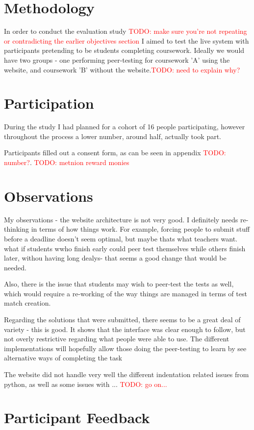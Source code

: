 \documentclass[a4paper,11pt]{report}
\newcommand{\todo}[1]{\textcolor{red}{TODO: #1}}
\begin{document}
\section{Methodology}
In order to conduct the evaluation study \todo{make sure you're not repeating or contradicting the earlier objectives section} I aimed to test the live system with participants pretending to be students completing coursework. Ideally we would have two groups - one performing peer-testing for coursework 'A' using the website, and coursework 'B' without the website.\todo{need to explain why?}
\section{Participation}
During the study I had planned for a cohort of 16 people participating, however throughout the process a lower number, around half, actually took part.\par
Participants filled out a consent form, as can be seen in appendix \todo{number?}.
\todo{metnion reward monies}
\section{Observations}
My observations - the website architecture is not very good. I definitely needs re-thinking in terms of how things work. For example, forcing people to submit stuff before a deadline doesn't seem optimal, but maybe thats what teachers want. what if students wwho finish early could peer test themselves while others finish later, withou having long dealys- that seems a good change that would be needed.\par
Also, there is the issue that students may wish to peer-test the tests as well, which would require a re-working of the way things are managed in terms of test match creation.\par
Regarding the solutions that were submitted, there seems to be a great deal of variety - this is good. It shows that the interface was clear enough to follow, but not overly restrictive regarding what people were able to use. The different implementations will hopefully allow those doing the peer-testing to learn by see alternative ways of completing the task\par
The website did not handle very well the different indentation related issues from python, as well as some issues with ... \todo{go  on...}
\section{Participant Feedback}
\end{document}
